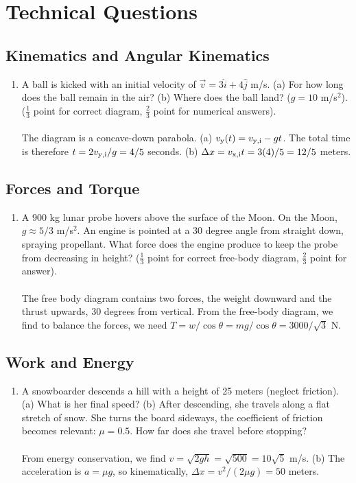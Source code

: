 \documentclass[10pt]{article}
\begin{document}
\section{Technical Questions}
\subsection{Kinematics and Angular Kinematics}
\begin{enumerate}
\item A ball is kicked with an initial velocity of $\vec{v} = 3\hat{i}+4\hat{j}$ m/s. (a) For how long does the ball remain in the air?  (b) Where does the ball land? ($g=10$ m/s$^2$). ($\frac{1}{3}$ point for correct diagram, $\frac{2}{3}$ point for numerical answers). \\ \\
The diagram is a concave-down parabola.  (a) $v_{\rm y}(t) = v_{\rm y,i} - gt$.  The total time is therefore $t = 2v_{\rm y,i}/g = 4/5$ seconds.  (b) $\Delta x = v_{\rm x,i}t = 3(4)/5 = 12/5$ meters.
\end{enumerate}
\subsection{Forces and Torque}
\begin{enumerate}
\item A 900 kg lunar probe hovers above the surface of the Moon.  On the Moon, $g \approx 5/3$ m/s$^2$.  An engine is pointed at a 30 degree angle from straight down, spraying propellant.  What force does the engine produce to keep the probe from decreasing in height?  ($\frac{1}{3}$ point for correct free-body diagram, $\frac{2}{3}$ point for answer).  \\ \\
The free body diagram contains two forces, the weight downward and the thrust upwards, 30 degrees from vertical.  From the free-body diagram, we find to balance the forces, we need $T = w/\cos\theta = mg/\cos\theta = 3000/\sqrt{3}$ N.
\end{enumerate}
\subsection{Work and Energy}
\begin{enumerate}
\item A snowboarder descends a hill with a height of 25 meters (neglect friction).  (a) What is her final speed?  (b) After descending, she travels along a flat stretch of snow.  She turns the board sideways, the coefficient of friction becomes relevant: $\mu = 0.5$.  How far does she travel before stopping? \\ \\
From energy conservation, we find $v = \sqrt{2gh} = \sqrt{500} = 10\sqrt{5}$ m/s.  (b) The acceleration is $a = \mu g$, so kinematically, $\Delta x = v^2/(2\mu g) = 50$ meters.
\end{enumerate}
\end{document}
